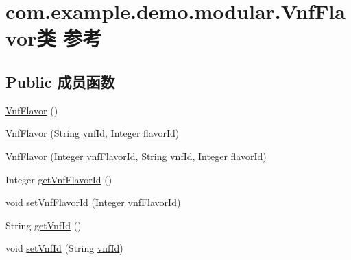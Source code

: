 \hypertarget{classcom_1_1example_1_1demo_1_1modular_1_1_vnf_flavor}{}\section{com.\+example.\+demo.\+modular.\+Vnf\+Flavor类 参考}
\label{classcom_1_1example_1_1demo_1_1modular_1_1_vnf_flavor}
\subsection*{Public 成员函数}
\begin{DoxyCompactItemize}
\item 
\mbox{\hyperlink{classcom_1_1example_1_1demo_1_1modular_1_1_vnf_flavor_a3f243a0e5d27dbf5ec9eefc2ca6a74ee}{Vnf\+Flavor}} ()
\item 
\mbox{\hyperlink{classcom_1_1example_1_1demo_1_1modular_1_1_vnf_flavor_a459089254d25ff72e71a39f187cb2b64}{Vnf\+Flavor}} (String \mbox{\hyperlink{classcom_1_1example_1_1demo_1_1modular_1_1_vnf_flavor_a1426a701ef8184b60e4839b9ad9c459d}{vnf\+Id}}, Integer \mbox{\hyperlink{classcom_1_1example_1_1demo_1_1modular_1_1_vnf_flavor_ac586094d1ac586a5924980aab97956a9}{flavor\+Id}})
\item 
\mbox{\hyperlink{classcom_1_1example_1_1demo_1_1modular_1_1_vnf_flavor_acf99bc503e707a076491dfcc0e21350f}{Vnf\+Flavor}} (Integer \mbox{\hyperlink{classcom_1_1example_1_1demo_1_1modular_1_1_vnf_flavor_a5ea2954222a779e7d24dcc186c3c5a70}{vnf\+Flavor\+Id}}, String \mbox{\hyperlink{classcom_1_1example_1_1demo_1_1modular_1_1_vnf_flavor_a1426a701ef8184b60e4839b9ad9c459d}{vnf\+Id}}, Integer \mbox{\hyperlink{classcom_1_1example_1_1demo_1_1modular_1_1_vnf_flavor_ac586094d1ac586a5924980aab97956a9}{flavor\+Id}})
\item 
Integer \mbox{\hyperlink{classcom_1_1example_1_1demo_1_1modular_1_1_vnf_flavor_ac40564766fb44bbd1c5472120e152672}{get\+Vnf\+Flavor\+Id}} ()
\item 
void \mbox{\hyperlink{classcom_1_1example_1_1demo_1_1modular_1_1_vnf_flavor_a096e82c9f8ff87d88358513cd3cd1155}{set\+Vnf\+Flavor\+Id}} (Integer \mbox{\hyperlink{classcom_1_1example_1_1demo_1_1modular_1_1_vnf_flavor_a5ea2954222a779e7d24dcc186c3c5a70}{vnf\+Flavor\+Id}})
\item 
String \mbox{\hyperlink{classcom_1_1example_1_1demo_1_1modular_1_1_vnf_flavor_a5686eb82e9dc3a002f4e90b8513b2c41}{get\+Vnf\+Id}} ()
\item 
void \mbox{\hyperlink{classcom_1_1example_1_1demo_1_1modular_1_1_vnf_flavor_aa7b47b17ea7b15a097683890bb6bdfa1}{set\+Vnf\+Id}} (String \mbox{\hyperlink{classcom_1_1example_1_1demo_1_1modular_1_1_vnf_flavor_a1426a701ef8184b60e4839b9ad9c459d}{vnf\+Id}})

\end{DoxyCompactItemize}
